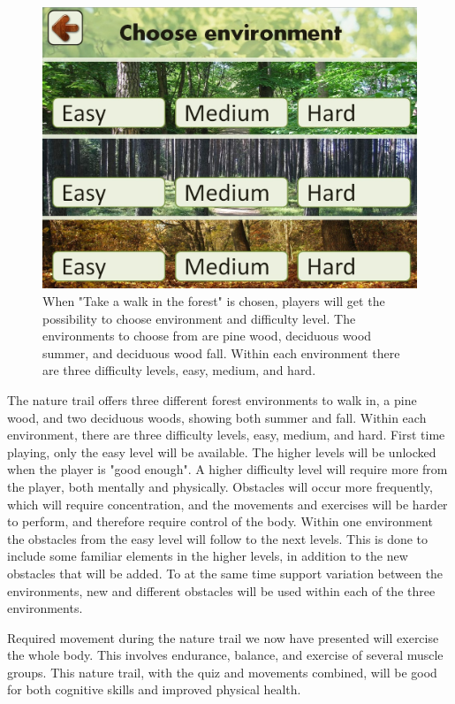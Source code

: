 \begin{figure} [H]
\centering
\includegraphics[scale=0.45]{chooseEnvironment.jpg}
\caption[Choice of environment and difficulty level]{When "Take a walk in the forest" is chosen, players will get the possibility to choose environment and difficulty level. The environments to choose from are pine wood, deciduous wood summer, and deciduous wood fall. Within each environment there are three difficulty levels, easy, medium, and hard.}
\label{fig:omgivelseNivaa}
\end{figure}

The nature trail offers three different forest environments to walk in, a pine wood, and two deciduous woods, showing both summer and fall. Within each environment, there are three difficulty levels, easy, medium, and hard. First time playing, only the easy level will be available. The higher levels will be unlocked when the player is "good enough". 
A higher difficulty level will require more from the player, both mentally and physically. Obstacles will occur more frequently, which will require concentration, and the movements and exercises will be harder to perform, and therefore require control of the body. Within one environment the obstacles from the easy level will follow to the next levels. This is done to include some familiar elements in the higher levels, in addition to the new obstacles that will be added. To at the same time support variation between the environments, new and different obstacles will be used within each of the three environments.  

Required movement during the nature trail we now have presented will exercise the whole body. This involves endurance, balance, and exercise of several muscle groups. This nature trail, with the quiz and movements combined, will be good for both cognitive skills and improved physical health.    
     
